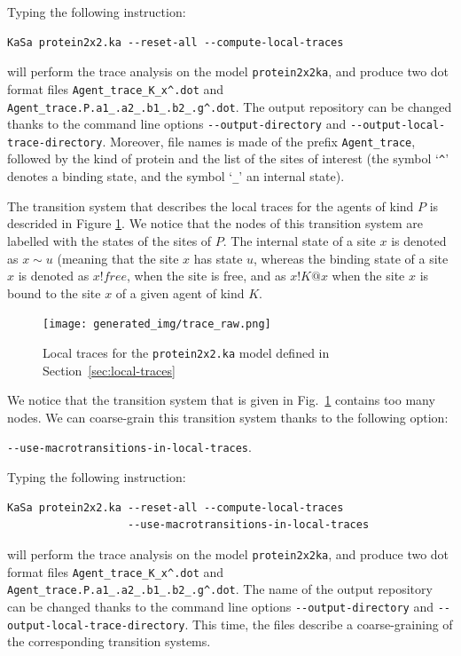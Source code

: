 \documentclass[11pt]{book}
\def\ttt#1{\texttt{#1}}
\begin{document}
Typing the following instruction:

\begin{verbatim}
KaSa protein2x2.ka --reset-all --compute-local-traces
\end{verbatim}

will perform the trace analysis on the model \texttt{protein2x2ka}, and produce
two dot format files \texttt{Agent\_trace\_K\_x\string^.dot} and \texttt{Agent\_trace.P.a1\_.a2\_.b1\_.b2\_.g\string^.dot}. The  output repository can be changed thanks to the command line options \texttt{-{}-output-directory} and \texttt{-{}-output-local-trace-directory}. Moreover, file names is made of the prefix \texttt{Agent\_trace}, followed by  the kind of protein and the list of the sites of interest (the symbol `\texttt{\string^}' denotes a binding state, and the symbol `\texttt{\_}' an internal state).

The transition system that describes the local traces for the agents of kind $P$ is descrided in Figure \ref{fig:trace-raw}. We notice that the nodes of this transition system are labelled with the states of the sites of $P$. The internal state of a site $x$ is denoted as $x{\sim}u$ (meaning that the site $x$ has state $u$, whereas the binding state of a site $x$ is denoted as $x!\textit{free}$, when the site is free, and as $x!K@x$ when the site $x$ is bound to the site $x$ of a given agent of kind $K$.

\begin{figure}[htbp]
\centering
\texttt{[image: generated\_img/trace\_raw.png]}
\caption{Local traces for the \ttt{protein2x2.ka} model defined in Section~\ref{sec:local-traces}}
\label{fig:trace-raw}
\end{figure}

We notice that the transition system that is given in Fig.~\ref{fig:trace-raw}  contains too many nodes. We can coarse-grain this transition system thanks to the following option:
\begin{center}
\texttt{-{}-use-macrotransitions-in-local-traces}.
\end{center}
Typing the following instruction:

\begin{verbatim}
KaSa protein2x2.ka --reset-all --compute-local-traces
                   --use-macrotransitions-in-local-traces
\end{verbatim}

will perform the trace analysis on the model \texttt{protein2x2ka}, and produce
two dot format files \texttt{Agent\_trace\_K\_x\string^.dot} and \texttt{Agent\_trace.P.a1\_.a2\_.b1\_.b2\_.g\string^.dot}. The name of the output repository can be changed thanks to the command line options \texttt{-{}-output-directory} and \texttt{-{}-output-local-trace-directory}.
This time, the files describe a coarse-graining of the corresponding transition systems.
\end{document}
